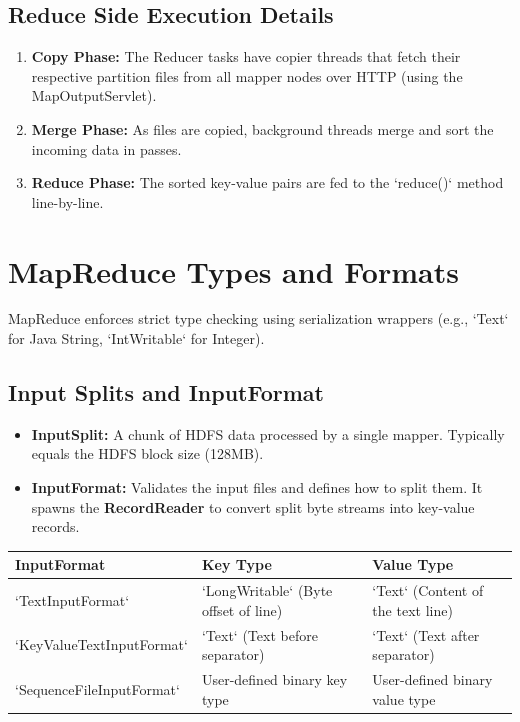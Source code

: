 \documentclass[12pt,a4paper]{article}
\renewcommand{\arraystretch}{1.45}
\begin{document}
\subsection{Reduce Side Execution Details}
\begin{enumerate}[leftmargin=*, itemsep=3pt]
  \item \textbf{Copy Phase:} The Reducer tasks have copier threads that fetch their respective partition files from all mapper nodes over HTTP (using the MapOutputServlet).
  \item \textbf{Merge Phase:} As files are copied, background threads merge and sort the incoming data in passes.
  \item \textbf{Reduce Phase:} The sorted key-value pairs are fed to the `reduce()` method line-by-line.
\end{enumerate}

\section{MapReduce Types and Formats}

MapReduce enforces strict type checking using serialization wrappers (e.g., `Text` for Java String, `IntWritable` for Integer).

\subsection{Input Splits and InputFormat}
\begin{itemize}[leftmargin=*, itemsep=3pt]
  \item \textbf{InputSplit:} A chunk of HDFS data processed by a single mapper. Typically equals the HDFS block size (128MB).
  \item \textbf{InputFormat:} Validates the input files and defines how to split them. It spawns the \textbf{RecordReader} to convert split byte streams into key-value records.
\end{itemize}

\par\vspace{6pt}\noindent
{\renewcommand{\arraystretch}{1.4}%
\begin{tabularx}{\linewidth}{|B{3.2cm}|Y|Y|}
\hline
\textbf{InputFormat} & \textbf{Key Type} & \textbf{Value Type} \\
\hline
`TextInputFormat` & `LongWritable` (Byte offset of line) & `Text` (Content of the text line) \\
\hline
`KeyValueTextInputFormat` & `Text` (Text before separator) & `Text` (Text after separator) \\
\hline
`SequenceFileInputFormat` & User-defined binary key type & User-defined binary value type \\
\hline
\end{tabularx}}
\end{document}
